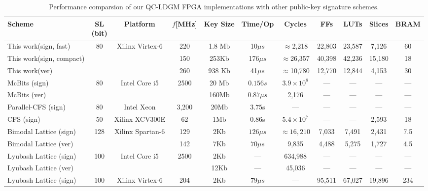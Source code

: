 \documentclass[10pt,journal,compsoc]{IEEEtran}
\begin{document}
\begin{table}[!t]\centering
\caption{Performance comparsion of our QC-LDGM FPGA implementations with other public-key signature schemes.}
\label{table:compare}
\begin{minipage}{\textwidth}\centering
\begin{tabular}{lcccccccccc}
\hline
Scheme &\tabincell{c}{SL\\ (bit)}&Platform &$f$[MHz] & Key Size & Time/Op & Cycles  & FFs & LUTs & Slices & BRAM\\
\hline
This work(sign, fast)& \multirow{3}{*}{80} &\multirow{3}{*}{Xilinx Virtex-6} & 220 & 1.8 Mb & 10$\mu s$ & $\approx$2,218 & 22,803 & 23,587 & 7,126 & 60\\
This work(sign, compact) &  & & 150 &253Kb & 176$\mu s$ & $\approx$26,357& 40,398 & 42,236 & 15,180 & 18\\
This work(ver) & & & 260 & 938 Kb & 41$\mu s$ & $\approx$10,780 & 12,770 & 12,844 & 4,153 & 30\\
\hline
McBits (sign)\cite{bernstein2013mcbits} &\multirow{2}{*}{80} &\multirow{2}{*}{Intel Core i5} & \multirow{2}{*}{2500} & 20 Mb & $0.156s$    & $3.9\times 10^8$ & --- & --- & ---& ---\\
McBits (ver)\cite{bernstein2013mcbits}&   &                              &                       &160Mb & $0.87\mu s$    & 2,176 & --- & --- & --- & ---\\
Parallel-CFS (sign)\cite{landais2012cfs,landais2012implementing}&80 &Intel Xeon & 3,200 & 20Mb & $3.75$s & --- & --- & --- & --- & ---\\
CFS (sign)\cite{beuchat2004fpga} &50& Xilinx XCV300E & 62       & 1Mb  & $0.86$s & $5.4\times 10^7$ & --- & --- & 2,593 & 18\\
\hline
Bimodal Lattice (sign)\cite{poppelmann2014enhanced} &\multirow{2}{*}{128} &\multirow{2}{*}{Xilinx Spartan-6} & 129 & 2Kb & $126\mu s$ & $\approx 16,210$ & 7,033 &7,491&2,431&7.5 \\
Bimodal Lattice (ver)\cite{poppelmann2014enhanced} &        &     &142 & 7Kb &$70 \mu s$ & 9,835& 4,488 &5,275&1,727&4.5\\
Lyubash Lattice (sign)\cite{guneysu2013software}&\multirow{2}{*}{100}&\multirow{2}{*}{Intel Core i5}&\multirow{2}{*}{2500}&2Kb&---&634,988&---&---&---&---\\
Lyubash Lattice (ver)\cite{guneysu2013software} & & & &12Kb& --- & 45,036 & --- &---&---&---\\
Lyubash Lattice (sign)\cite{guneysu2012practical}&\multirow{2}{*}{100}&\multirow{2}{*}{Xilinx Virtex-6}& 204 &2Kb&$79 \mu s$&---&95,511&67,027&19,896&234\\

\end{tabular}
\end{minipage}
\end{table}
\end{document}
